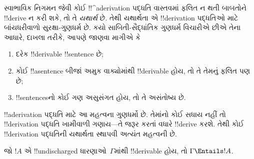 \documentclass[../../../include/open-logic-section]{subfiles}
\begin{document}
      {}
      {}


\begin{explain}
સ્વાભાવિક નિગમન જેવી કોઈ !!^a{derivation} પદ્ધતિ વાસ્તવમાં ફલિત ન થતી
બાબતોને !!{derive} ન કરી શકે, તો તે \emph{યથાર્થ} છે. તેથી યથાર્થતા
એ !!{derivation} પદ્ધતિઓ માટે બાંયધરીવાળો સુરક્ષા-ગુણધર્મ છે. કયો
સાબિતી-સૈદ્ધાંતિક ગુણધર્મ વિચારીએ છીએ તેના આધારે, દાખલા તરીકે, આપણે
જાણવા માગીએ કે
\begin{enumerate}
\item દરેક !!{derivable} !!{sentence}  છે;
\item કોઈ !!a{sentence} બીજાં અમુક વાક્યોમાંથી !!{derivable} હોય, તો તે
  તેમનું ફલિત પણ છે;
\item !!{sentence}sનો કોઈ ગણ અસુસંગત હોય, તો તે અસંતોષ્ય છે.
\end{enumerate}
!!a{derivation} પદ્ધતિ માટે આ મહત્વના ગુણધર્મો છે. તેમાંનો કોઈ સધાય
નહીં તો !!{derivation} પદ્ધતિ ખામીવાળી ગણાય---તે જરૂર કરતાં વધારે
!!{derive} કરશે. તેથી કોઈ !!{derivation} પદ્ધતિની યથાર્થતા સ્થાપવી
અત્યંત મહત્વની છે.
\end{explain}

\begin{thm}[યથાર્થતા]
જો $!A$ એ !!{undischarged} ધારણાઓ~$\Gamma$માંથી !!{derivable} હોય,
તો $\Gamma \Entails !A$.
\end{thm}
\end{document}
